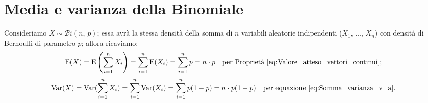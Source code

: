     \section{Media e varianza della Binomiale}
        \begin{obsv}
            Consideriamo $X\sim \mathcal{B}i(n,\,p)$; essa avrà la stessa densità della somma di $n$ variabili aleatorie indipendenti ($X_1,\, \ldots,\, X_{n}$) con densità di Bernoulli di parametro $p$; allora ricaviamo:
            \begin{align*}
                \text{E}(X) = \text{E}\left(\sum_{i=1}^{n} X_i\right) = \sum_{i=1}^{n} \text{E}(X_i) =
                \sum_{i=1}^{n} p = n \cdot p
                & & \text{per Proprietà}~\ref{eq:Valore_atteso_vettori_continui}
            ;\end{align*}
            \begin{align*}
                \text{Var}(X) = \text{Var}(\sum_{i=1}^{n} X_i) = \sum_{i=1}^{n} \text{Var}(X_i) = 
                \sum_{i=1}^{n} p(1-p) = n \cdot p(1-p)
                & & \text{per equazione}~\eqref{eq:Somma_varianza_v_a}
            .\end{align*}
        \end{obsv}
